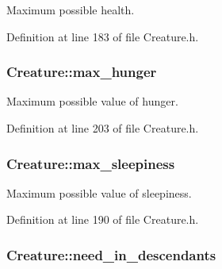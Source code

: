 Maximum possible health. 



Definition at line 183 of file Creature.\-h.

\hypertarget{classCreature_a49691e6b47ba6704b980963ab63c1881}{
\subsubsection[{max\-\_\-hunger}]{ Creature\-::max\-\_\-hunger\hspace{0.3cm}{\ttfamily [protected]}}}\label{classCreature_a49691e6b47ba6704b980963ab63c1881}


Maximum possible value of hunger. 



Definition at line 203 of file Creature.\-h.

\hypertarget{classCreature_ae52439324e6404f73bf0e316fdf5a31b}{
\subsubsection[{max\-\_\-sleepiness}]{ Creature\-::max\-\_\-sleepiness\hspace{0.3cm}{\ttfamily [protected]}}}\label{classCreature_ae52439324e6404f73bf0e316fdf5a31b}


Maximum possible value of sleepiness. 



Definition at line 190 of file Creature.\-h.

\hypertarget{classCreature_aed2975e3833046d705ae928dc2aed4b6}{
\subsubsection[{need\-\_\-in\-\_\-descendants}]{ Creature\-::need\-\_\-in\-\_\-descendants\hspace{0.3cm}{\ttfamily [protected]}}}\label{classCreature_aed2975e3833046d705ae928dc2aed4b6}


